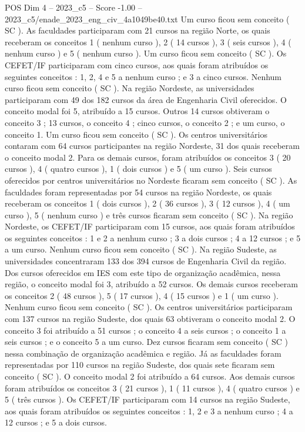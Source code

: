 \begin{textsample}{POS Dim 4 – 2023\_c5 – Score -1.00 – 2023\_c5/enade\_2023\_eng\_civ\_4a1049be40.txt}
Um curso ficou sem conceito ( SC ).
As faculdades participaram com 21 cursos na região Norte, os quais receberam os conceitos 1 ( nenhum curso ), 2 ( 14 cursos ), 3 ( seis cursos ), 4 ( nenhum curso ) e 5 ( nenhum curso ).
Um curso ficou sem conceito ( SC ).
Os CEFET/IF participaram com cinco cursos, aos quais foram atribuídos os seguintes conceitos : 1, 2, 4 e 5 a nenhum curso ; e 3 a cinco cursos.
Nenhum curso ficou sem conceito ( SC ).
Na região Nordeste, as universidades participaram com 49 dos 182 cursos da área de Engenharia Civil oferecidos.
O conceito modal foi 5, atribuído a 15 cursos.
Outros 14 cursos obtiveram o conceito 3 ; 13 cursos, o conceito 4 ; cinco cursos, o conceito 2 ; e um curso, o conceito 1.
Um curso ficou sem conceito ( SC ).
Os centros universitários contaram com 64 cursos participantes na região Nordeste, 31 dos quais receberam o conceito modal 2.
Para os demais cursos, foram atribuídos os conceitos 3 ( 20 cursos ), 4 ( quatro cursos ), 1 ( dois cursos ) e 5 ( um curso ).
Seis cursos oferecidos por centros universitários no Nordeste ficaram sem conceito ( SC ).
As faculdades foram representadas por 54 cursos na região Nordeste, os quais receberam os conceitos 1 ( dois cursos ), 2 ( 36 cursos ), 3 ( 12 cursos ), 4 ( um curso ), 5 ( nenhum curso ) e três cursos ficaram sem conceito ( SC ).
Na região Nordeste, os CEFET/IF participaram com 15 cursos, aos quais foram atribuídos os seguintes conceitos : 1 e 2 a nenhum curso ; 3 a dois cursos ; 4 a 12 cursos ; e 5 a um curso.
Nenhum curso ficou sem conceito ( SC ).
Na região Sudeste, as universidades concentraram 133 dos 394 cursos de Engenharia Civil da região.
Dos cursos oferecidos em IES com este tipo de organização acadêmica, nessa região, o conceito modal foi 3, atribuído a 52 cursos.
Os demais cursos receberam os conceitos 2 ( 48 cursos ), 5 ( 17 cursos ), 4 ( 15 cursos ) e 1 ( um curso ).
Nenhum curso ficou sem conceito ( SC ).
Os centros universitários participaram com 137 cursos na região Sudeste, dos quais 63 obtiveram o conceito modal 2.
O conceito 3 foi atribuído a 51 cursos ; o conceito 4 a seis cursos ; o conceito 1 a seis cursos ; e o conceito 5 a um curso.
Dez cursos ficaram sem conceito ( SC ) nessa combinação de organização acadêmica e região.
Já as faculdades foram representadas por 110 cursos na região Sudeste, dos quais sete ficaram sem conceito ( SC ).
O conceito modal 2 foi atribuído a 64 cursos.
Aos demais cursos foram atribuídos os conceitos 3 ( 21 cursos ), 1 ( 11 cursos ), 4 ( quatro cursos ) e 5 ( três cursos ).
Os CEFET/IF participaram com 14 cursos na região Sudeste, aos quais foram atribuídos os seguintes conceitos : 1, 2 e 3 a nenhum curso ; 4 a 12 cursos ; e 5 a dois cursos.

\end{textsample}
